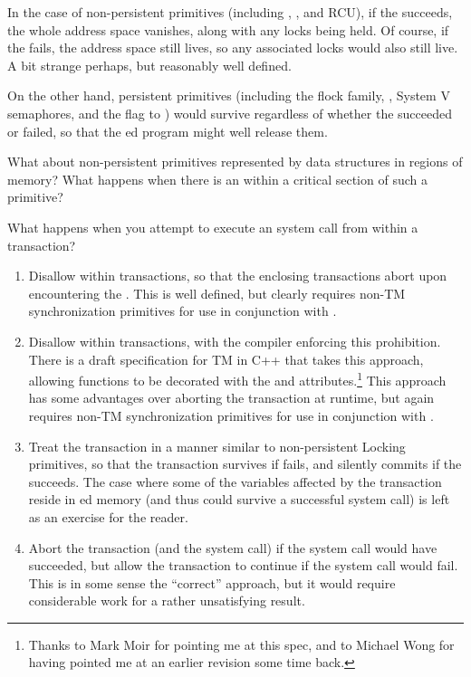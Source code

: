 In the case of non-persistent primitives (including
, , and RCU),
if the  succeeds, the whole address space vanishes, along
with any locks being held.
Of course, if the  fails, the address space still lives,
so any associated locks would also still live.
A bit strange perhaps, but reasonably well defined.

On the other hand, persistent primitives (including the flock family,
, System V semaphores, and the  flag to
) would survive regardless of whether the 
succeeded or failed, so that the ed program might well
release them.

\QuickQuiz{}
	What about non-persistent primitives represented by data
	structures in  regions of memory?
	What happens when there is an  within a critical
	section of such a primitive?
 \QuickQuizEnd

What happens when you attempt to execute an  system call
from within a transaction?

\begin{enumerate}
\item	Disallow  within transactions, so that the enclosing
	transactions abort upon encountering the .
	This is well defined, but clearly requires non-TM synchronization
	primitives for use in conjunction with .
\item	Disallow  within transactions, with the compiler
	enforcing this prohibition.
	There is a draft specification for TM in C++ that takes
	this approach, allowing functions to be decorated with
	the  and 
	attributes.\footnote{
		Thanks to Mark Moir for pointing me at this spec, and
		to Michael Wong for having pointed me at an earlier
		revision some time back.}
	This approach has some advantages over aborting the transaction
	at runtime, but again requires non-TM synchronization primitives
	for use in conjunction with .
\item	Treat the transaction in a manner similar to non-persistent
	Locking primitives, so that the transaction survives if 
	fails, and silently commits if the  succeeds.
	The case where some of the variables affected by the transaction
	reside in ed memory (and thus could survive a successful
	 system call) is left as an exercise for the reader.
\item	Abort the transaction (and the  system call) if the
	 system call would have succeeded, but allow the
	transaction to continue if the  system call would
	fail.
	This is in some sense the ``correct'' approach, but it would
	require considerable work for a rather unsatisfying result.
\end{enumerate}

